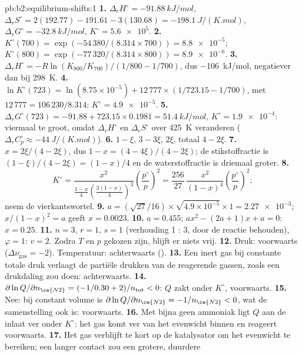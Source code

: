 \begin{solution}{pb:b2:equilibrium-shifts:1}
\textbf{1.} $\Delta_r H^\circ = \qty{-91.88}{kJ/mol}$, $\Delta_r S^\circ =
2(192.77) - 191.61 - 3(130.68) = \qty{-198.1}{J/(K.mol)}$, $\Delta_r G^\circ =
\qty{-32.8}{kJ/mol}$, $K^\circ = \num{5.6e5}$.
\textbf{2.} $K^\circ(700) = \exp(-54\,380/(8.314 \times 700)) = \num{8.8e-5}$;
$K^\circ(800) = \exp(-77\,320/(8.314 \times 800)) = \num{8.9e-6}$.
\textbf{3.} $\Delta_r H^\circ = -R\ln(K_{800}/K_{700})/(1/800 - 1/700)$,
dus \qty{-106}{kJ/mol}, negatiever dan bij \qty{298}{K}.
\textbf{4.} $\ln K^\circ(723) = \ln(8.75 \times 10^{-5}) + 12\,777 \times
(1/723.15 - 1/700)$, met $12\,777 = 106\,230/8.314$: $K^\circ =
\num{4.9e-5}$.
\textbf{5.} $\Delta_r G^\circ(723) = -91.88 + 723.15 \times 0.1981 =
\qty{51.4}{kJ/mol}$, $K^\circ = \num{1.9e-4}$: viermaal te groot, omdat
$\Delta_r H^\circ$ en $\Delta_r S^\circ$ over \qty{425}{K} veranderen
($\Delta_r C_p^\circ \approx \qty{-44}{J/(K.mol)}$).
\textbf{6.}  $1 - \xi$,  $3 - 3\xi$,  $2\xi$, totaal $4 -
2\xi$.
\textbf{7.} $x = 2\xi/(4 - 2\xi)$, dus $1 - x = (4 - 4\xi)/(4 - 2\xi)$; de
stikstoffractie is $(1 - \xi)/(4 - 2\xi) = (1 - x)/4$ en de waterstoffractie
is driemaal groter.
\textbf{8.}
\[
  K^\circ = \frac{x^2}{\frac{1-x}{4}\left(\frac{3(1-x)}{4}\right)^3}
  \left(\frac{p^\circ}{p}\right)^2 = \frac{256}{27}\,\frac{x^2}{(1 - x)^4}
  \left(\frac{p^\circ}{p}\right)^2 ;
\]
neem de vierkantswortel.
\textbf{9.} $a = (\sqrt{27}/16) \times \sqrt{4.9 \times 10^{-5}} \times 1 =
\num{2.27e-3}$; $x/(1 - x)^2 = a$ geeft $x = 0.0023$.
\textbf{10.} $a = 0.455$; $ax^2 - (2a + 1)x + a = 0$: $x = 0.25$.
\textbf{11.} $n = 3$, $r = 1$, $s = 1$ (verhouding 1 : 3, door de reactie behouden),
$\varphi = 1$: $v = 2$. Zodra $T$ en $p$ gekozen zijn, blijft er niets vrij.
\textbf{12.} Druk: voorwaarts ($\Delta\nu_{\text{gas}} = -2$). Temperatuur:
achterwaarts ().
\textbf{13.} Een inert gas bij constante totale druk verlaagt de partiële
drukken van de reagerende gassen, zoals een drukdaling zou doen: achterwaarts.
\textbf{14.} $\partial\ln Q/\partial n_{\ce{N2}} = (-1/0.30 + 2)/n_{\text{tot}} < 0$:
$Q$ zakt onder $K^\circ$, voorwaarts.
\textbf{15.} Nee: bij constant volume is $\partial\ln Q/\partial n_{\ce{N2}} =
-1/n_{\ce{N2}} < 0$, wat de samenstelling ook is: voorwaarts.
\textbf{16.} Met bijna geen ammoniak ligt $Q$ aan de inlaat ver onder $K^\circ$:
het gas komt ver van het evenwicht binnen en reageert voorwaarts.
\textbf{17.} Het gas verblijft te kort op de katalysator om het
evenwicht te bereiken; een langer contact zou een grotere, duurdere

\end{solution}
